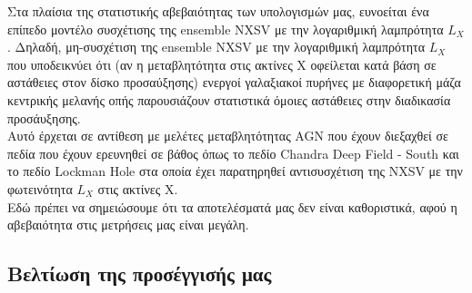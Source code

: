 Στα πλαίσια της στατιστικής αβεβαιότητας των υπολογισμών μας, ευνοείται ένα επίπεδο μοντέλο συσχέτισης της \textlatin{ensemble NXSV} με την λογαριθμική λαμπρότητα $L_X$. Δηλαδή, μη-συσχέτιση της \textlatin{ensemble NXSV} με την λογαριθμική λαμπρότητα $L_X$ που υποδεικνύει ότι (αν η μεταβλητότητα στις ακτίνες Χ οφείλεται κατά βάση σε αστάθειες στον δίσκο προσαύξησης) ενεργοί γαλαξιακοί πυρήνες με διαφορετική μάζα κεντρικής μελανής οπής παρουσιάζουν στατιστικά όμοιες αστάθειες στην διαδικασία προσάυξησης.\\
Αυτό έρχεται σε αντίθεση με μελέτες μεταβλητότητας \textlatin{AGN} που έχουν διεξαχθεί σε πεδία που έχουν ερευνηθεί σε βάθος όπως το πεδίο \textlatin{Chandra Deep Field - South}\cite{2017MNRAS.471.4398P} και το πεδίο \textlatin{Lockman Hole}\cite{2008A&A...487..475P} στα οποία έχει παρατηρηθεί αντισυσχέτιση της \textlatin{NXSV} με την φωτεινότητα $L_X$ στις ακτίνες Χ.\\
Εδώ πρέπει να σημειώσουμε ότι τα αποτελέσματά μας δεν είναι καθοριστικά, αφού η αβεβαιότητα στις μετρήσεις μας είναι μεγάλη. 

\subsection*{Βελτίωση της προσέγγισής μας}

